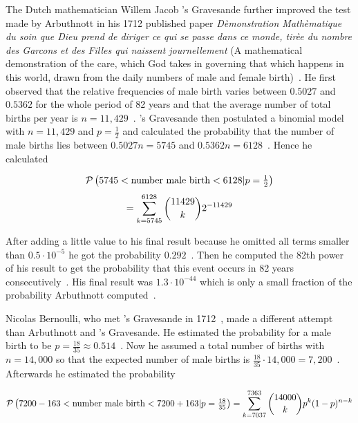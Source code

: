 
The Dutch mathematician Willem Jacob 's Gravesande further improved the test made by Arbuthnott in his 1712 published paper \emph{Dèmonstration Mathèmatique du soin que Dieu prend de diriger ce qui se passe dans ce monde, tirèe du nombre des Garcons et des Filles qui naissent journellement} (A mathematical demonstration of the care, which God takes in governing that which happens in this world, drawn from the daily numbers of male and female birth)~\cite[p. 279]{hald1}. He first observed that the relative frequencies of male birth varies between $0.5027$ and $0.5362$ for the whole period of 82 years and that the average number of total births per year is $n=11,429$~\cite[p. 279]{hald1}. 's Gravesande then postulated a binomial model with $n=11,429$ and $p=\tfrac 12$ and calculated the probability that the number of male births lies between $0.5027n=5745$ and $0.5362n=6128$~\cite[p. 280]{hald1}. Hence he calculated

\begin{multline}
    \P{5745 < \text{number male birth} < 6128|p=\tfrac 12} \nl
    = \sum_{k=5745}^{6128} \binom{11429} k 2^{-11429}
\end{multline}

After adding a little value to his final result because he omitted all terms smaller than $0.5\cdot 10^{-5}$ he got the probability $0.292$~\cite[p. 280]{hald1}. Then he computed the 82th power of his result to get the probability that this event occurs in 82 years consecutively~\cite[p. 280]{hald1}. His final result was $1.3\cdot10^{-44}$ which is only a small fraction of the probability Arbuthnott computed~\cite[p. 280]{hald1}.

Nicolas Bernoulli, who met 's Gravesande in 1712~\cite[p. 279]{hald1}, made a different attempt than Arbuthnott and 's Gravesande. He estimated the probability for a male birth to be $p=\tfrac{18}{35}\approx0.514$~\cite[p. 282]{hald1}. Now he assumed a total number of births with $n=14,000$ so that the expected number of male births is $\tfrac{18}{35}\cdot 14,000=7,200$~\cite[p. 282]{hald1}. Afterwards he estimated the probability

\begin{align}
    \P{7200-163 < \text{number male birth} < 7200+163|p=\tfrac{18}{35}} = \sum_{k=7037}^{7363} \binom {14000}{k} p^k (1-p)^{n-k}
\end{align}

